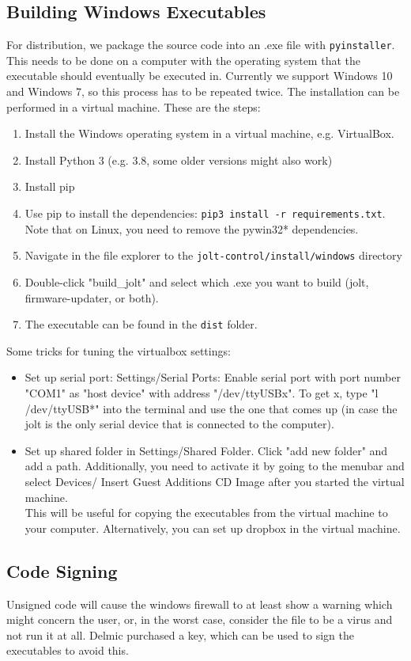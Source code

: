 \documentclass[]{article}
\begin{document}
\subsection{Building Windows Executables}
For distribution, we package the source code into an .exe file with \texttt{pyinstaller}. This needs to be done on a computer with the operating system that the executable should eventually be executed in. Currently we support Windows 10 and Windows 7, so this process has to be repeated twice. The installation can be performed in a virtual machine. 
These are the steps:
\begin{enumerate}
	\item Install the Windows operating system in a virtual machine, e.g. VirtualBox.
	\item Install Python 3 (e.g. 3.8, some older versions might also work)
	\item Install pip
	\item Use pip to install the dependencies: \texttt{pip3 install -r requirements.txt}. Note that on Linux, you need to remove the pywin32* dependencies.
	\item Navigate in the file explorer to the \texttt{jolt-control/install/windows} directory
	\item Double-click "build\_jolt" and select which .exe you want to build (jolt, firmware-updater, or both).
	\item The executable can be found in the \texttt{dist} folder.
\end{enumerate}
Some tricks for tuning the virtualbox settings:
\begin{itemize}
	\item Set up serial port: Settings/Serial Ports: Enable serial port with port number "COM1" as "host device" with address "/dev/ttyUSBx". To get x, type "l /dev/ttyUSB*" into the terminal and use the one that comes up (in case the jolt is the only serial device that is connected to the computer).
	\item Set up shared folder in Settings/Shared Folder. Click "add new folder" and add a path. Additionally, you need to activate it by going to the menubar and select Devices/ Insert Guest Additions CD Image after you started the virtual machine.\\
	This will be useful for copying the executables from the virtual machine to your computer. Alternatively, you can set up dropbox in the virtual machine.
\end{itemize}

\subsection{Code Signing}
Unsigned code will cause the windows firewall to at least show a warning which might concern the user, or, in the worst case, consider the file to be a virus and not run it at all. Delmic purchased a key, which can be used to sign the executables to avoid this.
\end{document}
